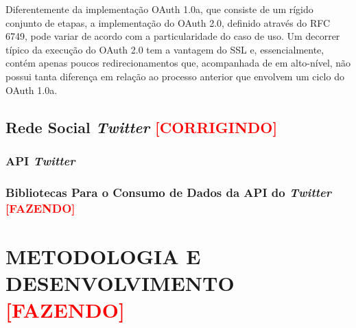 Diferentemente da implementação OAuth 1.0a, que consiste de um rígido conjunto de etapas, a implementação do OAuth 2.0, definido através do RFC 6749, pode variar de acordo com a particularidade do caso de uso. Um decorrer típico da execução do OAuth 2.0 tem a vantagem do SSL e, essencialmente, contém apenas poucos redirecionamentos que, acompanhada de em alto-nível, não possui tanta diferença em relação ao processo anterior que envolvem um ciclo do OAuth 1.0a.

\subsection{Rede Social \textit{Twitter} \textbf{\textcolor{red}{[CORRIGINDO]}}}



\subsubsection{API \textit{Twitter}}\label{api-twitter}
%

\subsubsection{Bibliotecas Para o Consumo de Dados da API do \textit{Twitter} \textbf{\textcolor{red}{[FAZENDO]}}}


\section{METODOLOGIA E DESENVOLVIMENTO \textbf{\textcolor{red}{[FAZENDO]}}}\label{sec: metodologia}

